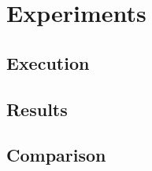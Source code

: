 
\chapter{Experiments}
\label{experiments}


\section{Execution}


\section{Results}


\section{Comparison}


